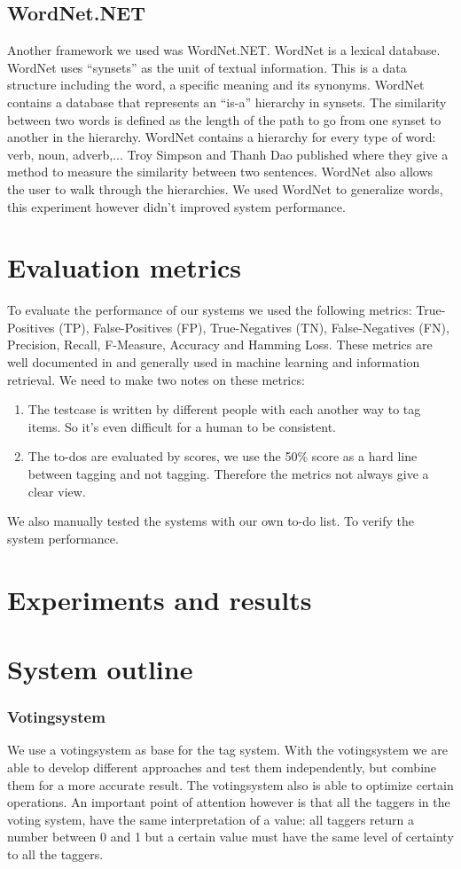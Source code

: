 \documentclass[a4paper,titlepage]{article}
\begin{document}
\subsection{WordNet.NET}
Another framework we used was WordNet.NET. WordNet is a lexical database. WordNet uses ``synsets'' as the unit of textual information. This is a data structure including the word, a specific meaning and its synonyms. WordNet contains a database that represents an ``is-a'' hierarchy in synsets. The similarity between two words is defined as the length of the path to go from one synset to another in the hierarchy. WordNet contains a hierarchy for every type of word: verb, noun, adverb,... Troy Simpson and Thanh Dao published \cite{codeproject1} where they give a method to measure the similarity between two sentences. WordNet also allows the user to walk through the hierarchies. We used WordNet to generalize words, this experiment however didn't improved system performance.
\section{Evaluation metrics}
To evaluate the performance of our systems we used the following metrics: True-Positives (TP), False-Positives (FP), True-Negatives (TN), False-Negatives (FN), Precision, Recall, F-Measure, Accuracy and Hamming Loss. These metrics are well documented in \cite{Francis99performancemeasures} and generally used in machine learning and information retrieval. We need to make two notes on these metrics:
\begin{enumerate}
 \item The testcase is written by different people with each another way to tag items. So it's even difficult for a human to be consistent.
 \item The to-dos are evaluated by scores, we use the 50\% score as a hard line between tagging and not tagging. Therefore the metrics not always give a clear view.
\end{enumerate}
We also manually tested the systems with our own to-do list. To verify the system performance.
\section{Experiments and results}
\section{System outline}
\subsubsection{Votingsystem}
We use a votingsystem as base for the tag system. With the votingsystem we are able to develop different approaches and test them independently, but combine them for a more accurate result. The votingsystem also is able to optimize certain operations. An important point of attention however is that all the taggers in the voting system, have the same interpretation of a value: all taggers return a number between 0 and 1
but a certain value must have the same level of certainty to all the taggers.
\end{document}
